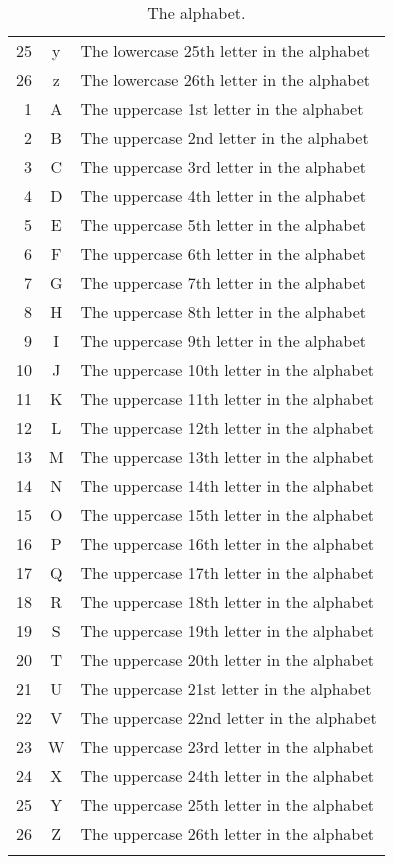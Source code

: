 \begin{longtable}{rcl}
  25 & y & The lowercase 25th letter in the alphabet\\
  26 & z & The lowercase 26th letter in the alphabet\\
   1 & A & The uppercase 1st letter in the alphabet\\
   2 & B & The uppercase 2nd letter in the alphabet\\
   3 & C & The uppercase 3rd letter in the alphabet\\
   4 & D & The uppercase 4th letter in the alphabet\\
   5 & E & The uppercase 5th letter in the alphabet\\
   6 & F & The uppercase 6th letter in the alphabet\\
   7 & G & The uppercase 7th letter in the alphabet\\
   8 & H & The uppercase 8th letter in the alphabet\\
   9 & I & The uppercase 9th letter in the alphabet\\
  10 & J & The uppercase 10th letter in the alphabet\\
  11 & K & The uppercase 11th letter in the alphabet\\
  12 & L & The uppercase 12th letter in the alphabet\\
  13 & M & The uppercase 13th letter in the alphabet\\
  14 & N & The uppercase 14th letter in the alphabet\\
  15 & O & The uppercase 15th letter in the alphabet\\
  16 & P & The uppercase 16th letter in the alphabet\\
  17 & Q & The uppercase 17th letter in the alphabet\\
  18 & R & The uppercase 18th letter in the alphabet\\
  19 & S & The uppercase 19th letter in the alphabet\\
  20 & T & The uppercase 20th letter in the alphabet\\
  21 & U & The uppercase 21st letter in the alphabet\\
  22 & V & The uppercase 22nd letter in the alphabet\\
  23 & W & The uppercase 23rd letter in the alphabet\\
  24 & X & The uppercase 24th letter in the alphabet\\
  25 & Y & The uppercase 25th letter in the alphabet\\
  26 & Z & The uppercase 26th letter in the alphabet\\
  \bottomrule
\caption{The alphabet.}
\label{tab:alphabet}
\end{longtable}


